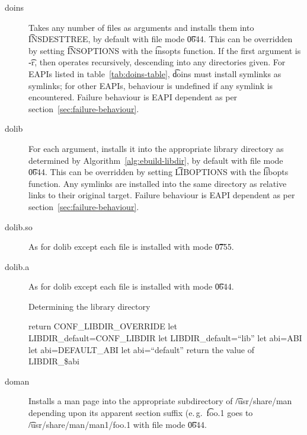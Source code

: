 \begin{description}
\item[doins]  Takes any number of files as arguments and installs them into
    \t{INSDESTTREE}, by default with file mode \t{0644}. This can be overridden by setting
    \t{INSOPTIONS} with the \t{insopts} function. If the first argument is \t{-r}, then operates
    recursively, descending into any directories given. For EAPIs listed in
    table~\ref{tab:doins-table}, \t{doins} must install symlinks as symlinks;
    for other EAPIs, behaviour is undefined if any symlink is encountered. Failure
    behaviour is EAPI dependent as per section~\ref{sec:failure-behaviour}.

\item[dolib] For each argument, installs it into the appropriate library directory as determined by
    Algorithm~\ref{alg:ebuild-libdir}, by default with file mode \t{0644}. This can be overridden by
    setting \t{LIBOPTIONS} with the \t{libopts} function. Any symlinks are installed into the same
    directory as relative links to their original target. Failure behaviour is EAPI dependent as per
    section~\ref{sec:failure-behaviour}.

\item[dolib.so] As for dolib except each file is installed with mode \t{0755}.

\item[dolib.a] As for dolib except each file is installed with mode \t{0644}.

\begin{algorithm}
\caption{Determining the library directory} \label{alg:ebuild-libdir}
\begin{algorithmic}[1]
    \STATE return CONF\_LIBDIR\_OVERRIDE
\ENDIF
{}
    \STATE let LIBDIR\_default=CONF\_LIBDIR
\ELSE
    \STATE let LIBDIR\_default=``lib''
\ENDIF
{}
    \STATE let abi=ABI
    \STATE let abi=DEFAULT\_ABI
\ELSE
    \STATE let abi=``default''
\ENDIF
\STATE return the value of LIBDIR\_\$abi
\end{algorithmic}
\end{algorithm}

\item[doman] Installs a man page into the appropriate subdirectory of \t{/usr/share/man} depending
    upon its apparent section suffix (e.\,g.\ \t{foo.1} goes to \t{/usr/share/man/man1/foo.1} with
    file mode \t{0644}.


\end{description}
